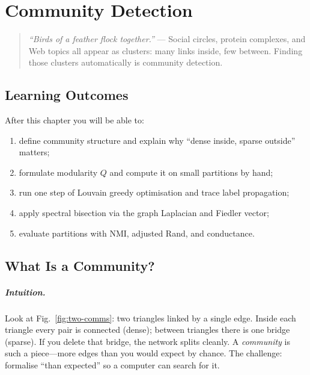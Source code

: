 \chapter{Community Detection}
\label{ch:community}
\sloppy

\begin{quote}
\emph{``Birds of a feather flock together.''} --- Social circles, protein complexes, and Web topics all appear as clusters: many links inside, few between. Finding those clusters automatically is community detection.
\end{quote}

\noindent{}
\vspace{0.4em}

\section*{Learning Outcomes}
After this chapter you will be able to:
\begin{enumerate}[label=(L\arabic*)]
    \item define community structure and explain why ``dense inside, sparse outside'' matters;
    \item formulate modularity $Q$ and compute it on small partitions by hand;
    \item run one step of Louvain greedy optimisation and trace label propagation;
    \item apply spectral bisection via the graph Laplacian and Fiedler vector;
    \item evaluate partitions with NMI, adjusted Rand, and conductance.
\end{enumerate}

\section{What Is a Community?}
\label{sec:what-community}
\paragraph{Intuition.} Look at Fig.~\ref{fig:two-comms}: two triangles linked by a single edge. Inside each triangle every pair is connected (dense); between triangles there is one bridge (sparse). If you delete that bridge, the network splits cleanly. A \emph{community} is such a piece---more edges than you would expect by chance. The challenge: formalise ``than expected'' so a computer can search for it.


